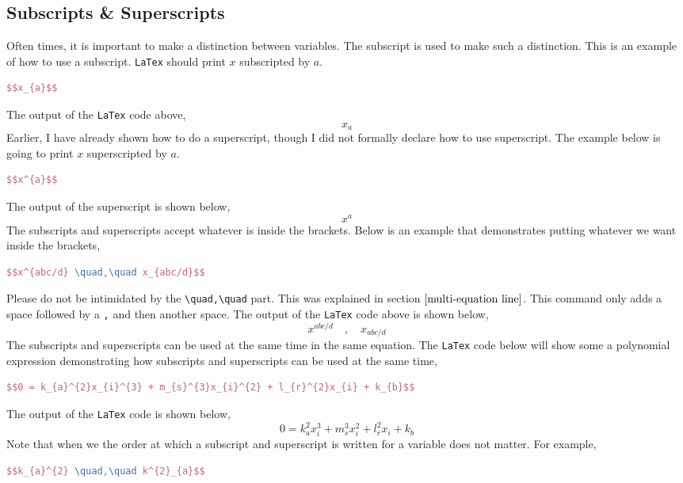 \documentclass[a4paper, 12pt]{report}
\begin{document}
\begin{center}
\subsection{Subscripts \& Superscripts} \label{subscript superscript}
\begin{comment}
\end{comment}
Often times, it is important to make a distinction between variables. The subscript is used to make such a distinction. This is an example of how to use a subscript. \texttt{LaTex} should print $x$ subscripted by $a$.
\begin{lstlisting}[language=tex]
$$x_{a}$$
\end{lstlisting}
The output of the \texttt{LaTex} code above,
$$x_{a}$$
Earlier, I have already shown how to do a superscript, though I did not formally declare how to use superscript. The example below is going to print $x$ superscripted by $a$.
\begin{lstlisting}[language=tex]
$$x^{a}$$
\end{lstlisting}
The output of the superscript is shown below,
$$x^{a}$$
The subscripts and superscripts accept whatever is inside the brackets. Below is an example that demonstrates putting whatever we want inside the brackets,
\begin{lstlisting}[language=tex]
$$x^{abc/d} \quad,\quad x_{abc/d}$$
\end{lstlisting}
Please do not be intimidated by the \texttt{\textbackslash quad,\textbackslash quad} part. This was explained in section $\ref{multi-equation line}$. This command only adds a space followed by a \texttt{,} and then another space. The output of the \texttt{LaTex} code above is shown below,
$$x^{abc/d} \quad,\quad x_{abc/d}$$
The subscripts and superscripts can be used at the same time in the same equation. The \texttt{LaTex} code below will show some a polynomial expression demonstrating how subscripts and superscripts can be used at the same time,
\begin{lstlisting}[language=tex]
$$0 = k_{a}^{2}x_{i}^{3} + m_{s}^{3}x_{i}^{2} + l_{r}^{2}x_{i} + k_{b}$$
\end{lstlisting}
The output of the \texttt{LaTex} code is shown below,
$$0 = k_{a}^{2}x_{i}^{3} + m_{s}^{3}x_{i}^{2} + l_{r}^{2}x_{i} + k_{b}$$
Note that when we the order at which a subscript and superscript is written for a variable does not matter. For example,
\begin{lstlisting}[language=tex]
$$k_{a}^{2} \quad,\quad k^{2}_{a}$$
\end{lstlisting}

\end{center}
\end{document}
